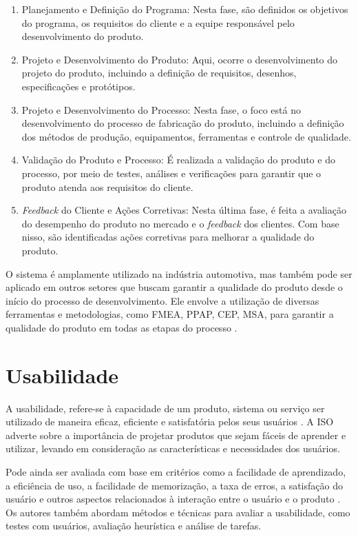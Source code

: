 \begin{enumerate}
    \item Planejamento e Definição do Programa: Nesta fase, são definidos os objetivos do programa, os requisitos do cliente e a equipe responsável pelo desenvolvimento do produto.
    \item Projeto e Desenvolvimento do Produto: Aqui, ocorre o desenvolvimento do projeto do produto, incluindo a definição de requisitos, desenhos, especificações e protótipos.
    \item Projeto e Desenvolvimento do Processo: Nesta fase, o foco está no desenvolvimento do processo de fabricação do produto, incluindo a definição dos métodos de produção, equipamentos, ferramentas e controle de qualidade.
    \item Validação do Produto e Processo: É realizada a validação do produto e do processo, por meio de testes, análises e verificações para garantir que o produto atenda aos requisitos do cliente.
    \item \textit{Feedback} do Cliente e Ações Corretivas: Nesta última fase, é feita a avaliação do desempenho do produto no mercado e o \textit{feedback} dos clientes. Com base nisso, são identificadas ações corretivas para melhorar a qualidade do produto.
\end{enumerate}

O sistema é amplamente utilizado na indústria automotiva, mas também pode ser aplicado em outros setores que buscam garantir a qualidade do produto desde o início do processo de desenvolvimento. Ele envolve a utilização de diversas ferramentas e metodologias, como \gls{FMEA}, \gls{PPAP}, \gls{CEP}, \gls{MSA}, para garantir a qualidade do produto em todas as etapas do processo  \cite{apqp}.

\section{Usabilidade}

A usabilidade, refere-se à capacidade de um produto, sistema ou serviço ser utilizado de maneira eficaz, eficiente e satisfatória pelos seus usuários \cite{iso20199241}. A ISO adverte sobre a importância de projetar produtos que sejam fáceis de aprender e utilizar, levando em consideração as características e necessidades dos usuários. 

Pode ainda ser avaliada com base em critérios como a facilidade de aprendizado, a eficiência de uso, a facilidade de memorização, a taxa de erros, a satisfação do usuário e outros aspectos relacionados à interação entre o usuário e o produto \cite{betiol2010ergonomia}. Os autores também abordam métodos e técnicas para avaliar a usabilidade, como testes com usuários, avaliação heurística e análise de tarefas.


